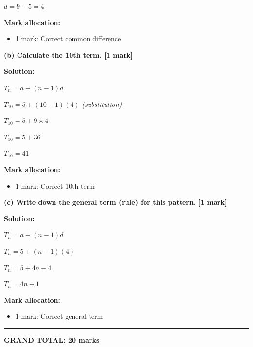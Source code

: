 \documentclass[12pt,a4paper]{article}
\begin{document}
$d = 9 - 5 = 4$ \checkmark

\vspace{0.3cm}
\noindent\textbf{Mark allocation:}
\begin{itemize}
    \item 1 mark: Correct common difference
\end{itemize}

\vspace{0.4cm}

\textbf{(b) Calculate the 10th term. \hfill [1 mark]}

\vspace{0.2cm}
\noindent\textbf{Solution:}

$T_n = a + (n-1)d$

$T_{10} = 5 + (10-1)(4)$ \checkmark \quad \textit{(substitution)}

$T_{10} = 5 + 9 \times 4$

$T_{10} = 5 + 36$

$T_{10} = 41$

\vspace{0.3cm}
\noindent\textbf{Mark allocation:}
\begin{itemize}
    \item 1 mark: Correct 10th term
\end{itemize}

\vspace{0.4cm}

\textbf{(c) Write down the general term (rule) for this pattern. \hfill [1 mark]}

\vspace{0.2cm}
\noindent\textbf{Solution:}

$T_n = a + (n-1)d$

$T_n = 5 + (n-1)(4)$

$T_n = 5 + 4n - 4$

$T_n = 4n + 1$ \checkmark

\vspace{0.3cm}
\noindent\textbf{Mark allocation:}
\begin{itemize}
    \item 1 mark: Correct general term
\end{itemize}

\vspace{1cm}
\hrule
\vspace{0.3cm}
\noindent\textbf{GRAND TOTAL: 20 marks}
\end{document}
